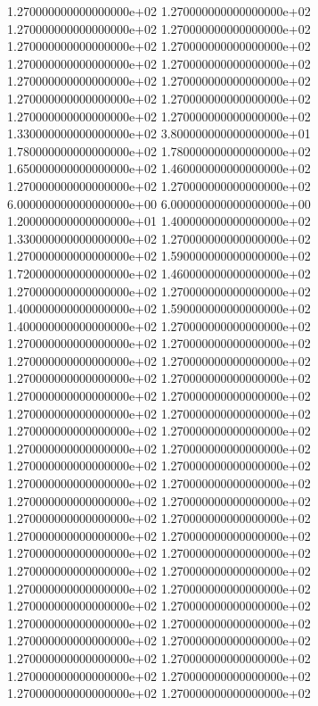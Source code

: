 1.270000000000000000e+02 1.270000000000000000e+02 1.270000000000000000e+02 1.270000000000000000e+02 1.270000000000000000e+02 1.270000000000000000e+02 1.270000000000000000e+02 1.270000000000000000e+02 1.270000000000000000e+02 1.270000000000000000e+02 1.270000000000000000e+02 1.270000000000000000e+02 1.270000000000000000e+02 1.270000000000000000e+02 1.330000000000000000e+02 3.800000000000000000e+01 1.780000000000000000e+02 1.780000000000000000e+02 1.650000000000000000e+02 1.460000000000000000e+02 1.270000000000000000e+02 1.270000000000000000e+02 6.000000000000000000e+00 6.000000000000000000e+00 1.200000000000000000e+01 1.400000000000000000e+02 1.330000000000000000e+02 1.270000000000000000e+02 1.270000000000000000e+02 1.590000000000000000e+02 1.720000000000000000e+02 1.460000000000000000e+02 1.270000000000000000e+02 1.270000000000000000e+02 1.400000000000000000e+02 1.590000000000000000e+02 1.400000000000000000e+02 1.270000000000000000e+02 1.270000000000000000e+02 1.270000000000000000e+02 1.270000000000000000e+02 1.270000000000000000e+02 1.270000000000000000e+02 1.270000000000000000e+02 1.270000000000000000e+02 1.270000000000000000e+02 1.270000000000000000e+02 1.270000000000000000e+02 1.270000000000000000e+02 1.270000000000000000e+02 1.270000000000000000e+02 1.270000000000000000e+02 1.270000000000000000e+02 1.270000000000000000e+02 1.270000000000000000e+02 1.270000000000000000e+02 1.270000000000000000e+02 1.270000000000000000e+02 1.270000000000000000e+02 1.270000000000000000e+02 1.270000000000000000e+02 1.270000000000000000e+02 1.270000000000000000e+02 1.270000000000000000e+02 1.270000000000000000e+02 1.270000000000000000e+02 1.270000000000000000e+02 1.270000000000000000e+02 1.270000000000000000e+02 1.270000000000000000e+02 1.270000000000000000e+02 1.270000000000000000e+02 1.270000000000000000e+02 1.270000000000000000e+02 1.270000000000000000e+02 1.270000000000000000e+02 1.270000000000000000e+02 1.270000000000000000e+02 1.270000000000000000e+02 1.270000000000000000e+02
